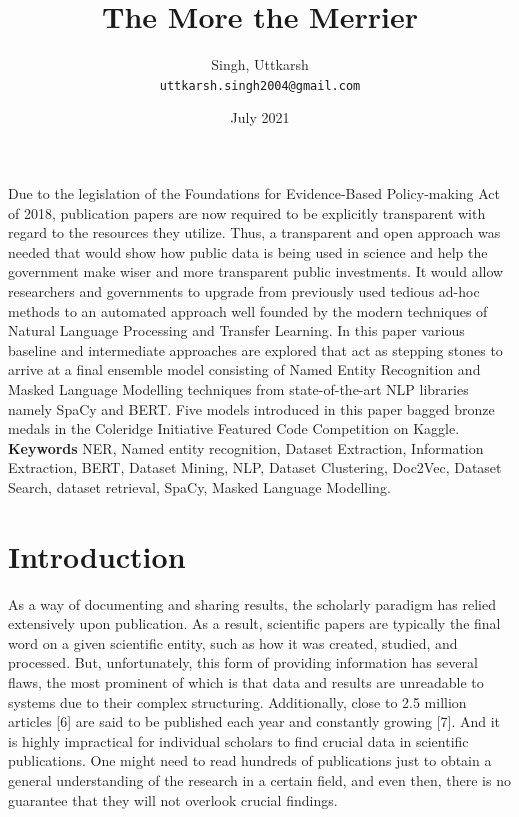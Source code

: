 \documentclass[twocolumn]{article}
\title{\textbf{The More the Merrier}}
\author{
  Singh, Uttkarsh\\
  \texttt{uttkarsh.singh2004@gmail.com}
  \date{July 2021}}
\renewenvironment{abstract}
 {\normalsize
  \begin{center}
  \bfseries \abstractname\vspace{-.5em}\vspace{0pt}
  \end{center}
  \list{}{
    \setlength{\leftmargin}{.5cm}%
    \setlength{\rightmargin}{\leftmargin}%
  }%
  \item\relax}
 {\endlist}
\begin{document}
\maketitle

\begin{abstract}
Due to the legislation of the Foundations for Evidence-Based Policy-making Act of 2018, publication papers are now required to be explicitly transparent with regard to the resources they utilize. Thus, a transparent and open approach was needed that would show how public data is being used in science and help the government make wiser and more transparent public investments. It would allow researchers and governments to upgrade from previously used tedious ad-hoc methods to an automated approach well founded by the modern techniques of Natural Language Processing and Transfer Learning. In this paper various baseline and intermediate approaches are explored that act as stepping stones to arrive at a final ensemble model consisting of Named Entity Recognition and Masked Language Modelling techniques from state-of-the-art NLP libraries namely SpaCy and BERT. Five models introduced in this paper bagged bronze medals in the Coleridge Initiative Featured Code Competition on Kaggle.
\end{abstract}
\textbf{Keywords} NER, Named entity recognition,
Dataset Extraction, Information Extraction, BERT, Dataset Mining, NLP,
Dataset Clustering, Doc2Vec, Dataset Search, dataset retrieval,
SpaCy, Masked Language Modelling.


\section{Introduction}
As a way of documenting and sharing results, the scholarly paradigm has relied extensively upon publication. As a result, scientific papers are typically the final word on a given scientific entity, such as how it was created, studied, and processed. But, unfortunately, this form of providing information has several flaws, the most prominent of which is that data and results are unreadable to systems due to their complex structuring. Additionally, close to 2.5 million articles [6] are said to be published each year and constantly growing [7]. And it is highly impractical for individual scholars to find crucial data in scientific publications. One might need to read hundreds of publications just to obtain a general understanding of the research in a certain field, and even then, there is no guarantee that they will not overlook crucial findings. \par
\end{document}
